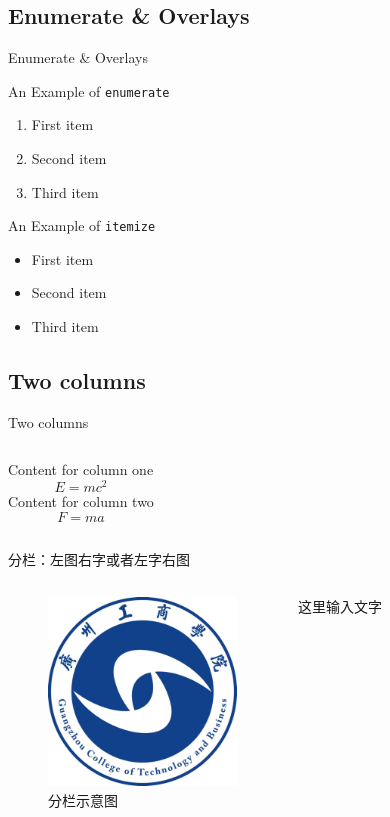 \documentclass[
10pt,
aspectratio=43,
]{beamer}
\begin{document}
\subsection{Enumerate \& Overlays}

\begin{frame}[c]{Enumerate \& Overlays}

	{\large An Example of \texttt{enumerate}}
	\begin{enumerate}[<+->]
		\item First item
		\item Second item
		\item Third item
	\end{enumerate}
	\vfill
	{\large An Example of \texttt{itemize}}
	\begin{itemize}[<+->]
		\item First item
		\item Second item
		\item Third item
	\end{itemize}
\end{frame}

\subsection{Two columns}
\begin{frame}[c]{Two columns}

	\begin{columns}[onlytextwidth]
		Content for column one
		\begin{equation}
			E = mc^2
		\end{equation}
		Content for column two
		\begin{equation}
			F=ma
		\end{equation}
	\end{columns}
\end{frame}

\begin{frame}{分栏：左图右字或者左字右图}
	\begin{columns}
		\begin{figure}
			\centering
			\includegraphics[width=5cm]{logo}
			\caption{分栏示意图}
		\end{figure}
		\small
		这里输入文字
	\end{columns}
\end{frame}
\end{document}
